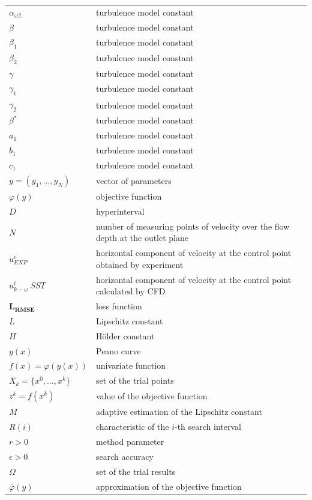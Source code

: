 \documentclass[mathematics,article,submit,pdftex,moreauthors]{Definitions/mdpi}
\begin{document}
\begin{table}[H]
\begin{tabularx}{\textwidth}{ll}
$\alpha_{\omega2}$ & turbulence model constant \\
$\beta$ & turbulence model constant \\
$\beta_1$ & turbulence model constant \\
$\beta_2$ & turbulence model constant \\
$\gamma$ & turbulence model constant \\
$\gamma_1$ & turbulence model constant \\
$\gamma_2$ & turbulence model constant \\
$\beta^*$ & turbulence model constant \\
$a_1$ & turbulence model constant \\
$b_1$ & turbulence model constant \\
$c_1$ & turbulence model constant \\
$y = (y_1, ..., y_N)$ & vector of parameters\\
$\varphi(y)$		& objective function	\\
$D$	& hyperinterval	\\
$N$		& number of measuring points of velocity over the flow depth at the outlet plane	\\
$u^i_{EXP}$		& horizontal component of velocity at the control point obtained by experiment	\\
$u^i_{k-\omega}\ SST$		& horizontal component of velocity at the control point calculated by CFD	\\
$\boldsymbol{L_{RMSE}}$		& loss function	\\
$L$		& Lipschitz constant	\\
$H$		& H{\"o}lder constant	\\
$y(x)$		& Peano curve	\\
$f(x) = \varphi(y(x))$		& univariate function	\\
$X_k=\{x^0,\dots,x^k\} $ & set of the trial points \\
$z^k = f(x^k)$ & value of the objective function \\
$M$		& adaptive estimation of the Lipschitz constant \\
$R(i)$		& characteristic of the $i$-th search interval\\
$r>0$		& method parameter	\\
$\epsilon > 0$		& search accuracy	\\
$\Omega $ & set of the trial results \\
$\overline{\varphi}(y)$ & approximation of the objective function \\
\bottomrule
\end{tabularx}
\end{table}
\end{document}
